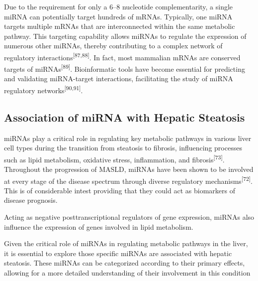 \documentclass[
  11pt,
  letterpaper,
]{book}
\begin{document}
Due to the requirement for only a 6--8 nucleotide complementarity, a
single miRNA can potentially target hundreds of mRNAs. Typically, one
miRNA targets multiple mRNAs that are interconnected within the same
metabolic pathway. This targeting capability allows miRNAs to regulate
the expression of numerous other miRNAs, thereby contributing to a
complex network of regulatory interactions\textsuperscript{{[}87,88{]}}.
In fact, most mammalian mRNAs are conserved targets of
miRNAs\textsuperscript{{[}89{]}}. Bioinformatic tools have become
essential for predicting and validating miRNA-target interactions,
facilitating the study of miRNA regulatory
networks\textsuperscript{{[}90,91{]}}.

\subsection{Association of miRNA with Hepatic
Steatosis}\label{association-of-mirna-with-hepatic-steatosis}

miRNAs play a critical role in regulating key metabolic pathways in
various liver cell types during the transition from steatosis to
fibrosis, influencing processes such as lipid metabolism, oxidative
stress, inflammation, and fibrosis\textsuperscript{{[}73{]}}. Throughout
the progression of MASLD, miRNAs have been shown to be involved at every
stage of the disease spectrum through diverse regulatory
mechanisms\textsuperscript{{[}72{]}}. This is of considerable intest
providing that they could act as biomarkers of disease prognosis.

Acting as negative posttranscriptional regulators of gene expression,
miRNAs also influence the expression of genes involved in lipid
metabolism.

Given the critical role of miRNAs in regulating metabolic pathways in
the liver, it is essential to explore those specific miRNAs are
associated with hepatic steatosis. These miRNAs can be categorized
according to their primary effects, allowing for a more detailed
understanding of their involvement in this condition
\end{document}
